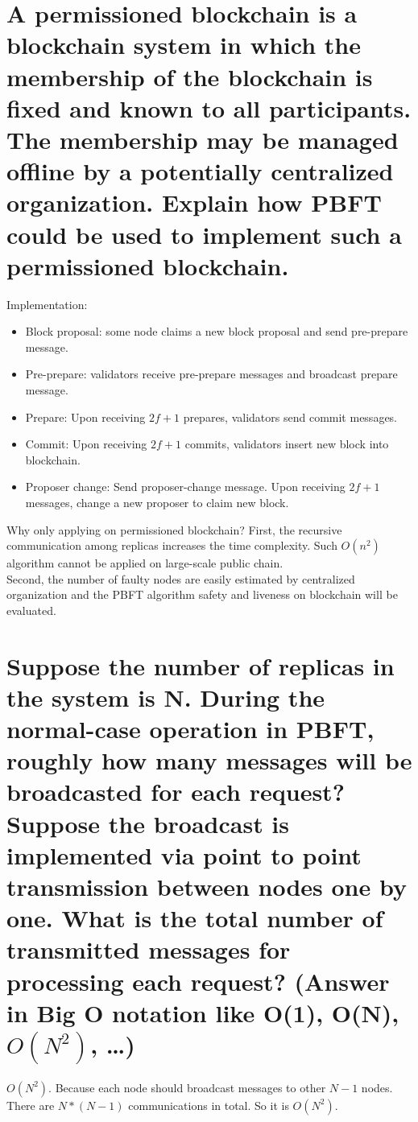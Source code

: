 \documentclass{article}
\begin{document}
\section{A permissioned blockchain is a blockchain system in which the membership of the
blockchain is fixed and known to all participants. The membership may be
managed offline by a potentially centralized organization. Explain how PBFT could
be used to implement such a permissioned blockchain.}
Implementation:
\begin{itemize}
    \item Block proposal: some node claims a new block proposal and send pre-prepare message.
    \item Pre-prepare: validators receive pre-prepare messages and broadcast prepare message.
    \item Prepare: Upon receiving $2f+1$ prepares, validators send commit messages.
    \item Commit: Upon receiving $2f+1$ commits, validators insert new block into blockchain.
    \item Proposer change: Send proposer-change message. Upon receiving $2f+1$ messages, change a new proposer to claim new block.
\end{itemize}
Why only applying on permissioned blockchain?
First, the recursive communication among replicas increases the time complexity. Such $O(n^2)$ algorithm cannot be applied on large-scale public chain.\\
Second, the number of faulty nodes are easily estimated by centralized organization and the PBFT algorithm safety and liveness on blockchain will be evaluated.\\
\section{Suppose the number of replicas in the system is N. During the normal-case
operation in PBFT, roughly how many messages will be broadcasted for each
request? Suppose the broadcast is implemented via point to point transmission
between nodes one by one. What is the total number of transmitted messages for
processing each request? (Answer in Big O notation like O(1), O(N), $O(N^2)$, …)}
$O(N^2)$. Because each node should broadcast messages to other $N-1$ nodes. There are $N*(N-1)$ communications in total. So it is $O(N^2)$.
\end{document}
